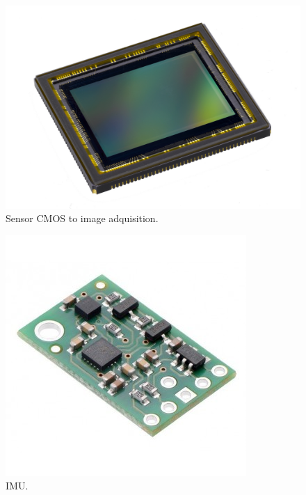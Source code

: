 \begin{center}
	\begin{figure}[H]
		\center
		\includegraphics[scale=0.1]{imagenes/EstadoArte/sensor_imagen_CMOS.jpg}
		\caption{Sensor CMOS to image adquisition.}
		\label{fig:camara_CMOS}
	\end{figure}
\end{center}

\begin{center}
	\begin{figure}[H]
		\center
		\includegraphics[scale=0.4]{imagenes/EstadoArte/IMU.jpg}
		\caption{IMU.}
		\label{fig:IMU}
	\end{figure}
\end{center}

